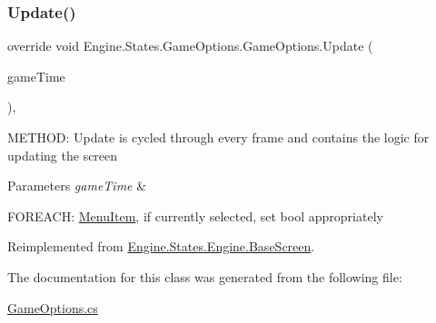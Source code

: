\subsubsection{\texorpdfstring{Update()}{Update()}}
{\footnotesize\ttfamily override void Engine.\+States.\+Game\+Options.\+Game\+Options.\+Update (\begin{DoxyParamCaption}\item[{Game\+Time}]{game\+Time }\end{DoxyParamCaption})\hspace{0.3cm}{\ttfamily [inline]}, {\ttfamily [virtual]}}



M\+E\+T\+H\+OD\+: Update is cycled through every frame and contains the logic for updating the screen 


\begin{DoxyParams}{Parameters}
{\em game\+Time} & \\
\hline
\end{DoxyParams}
F\+O\+R\+E\+A\+CH\+: \hyperlink{a00578}{Menu\+Item}, if currently selected, set bool appropriately 

Reimplemented from \hyperlink{a00550_a098ece7d1e112475f6e880c3a672af64}{Engine.\+States.\+Engine.\+Base\+Screen}.



The documentation for this class was generated from the following file\+:\begin{DoxyCompactItemize}
\item 
\hyperlink{a00200}{Game\+Options.\+cs}\end{DoxyCompactItemize}
